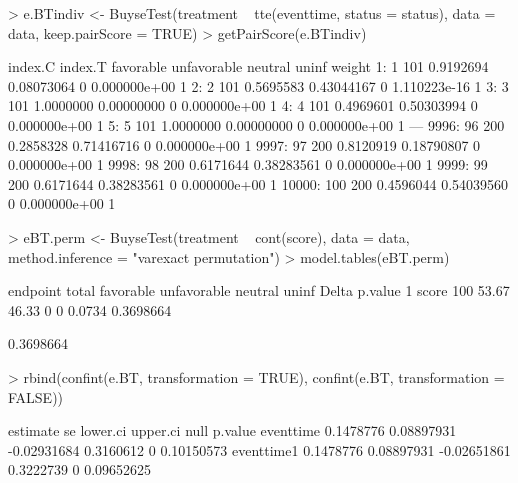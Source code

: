 \documentclass[12pt]{article}
\theoremstyle{definition}
\begin{document}
\begin{Rcode}
> e.BTindiv <- BuyseTest(treatment ~ tte(eventtime, status = status),
                       data = data, keep.pairScore = TRUE)
> getPairScore(e.BTindiv)
\end{Rcode}
\begin{Routput}
       index.C index.T favorable unfavorable neutral        uninf weight
    1:       1     101 0.9192694  0.08073064       0 0.000000e+00      1
    2:       2     101 0.5695583  0.43044167       0 1.110223e-16      1
    3:       3     101 1.0000000  0.00000000       0 0.000000e+00      1
    4:       4     101 0.4969601  0.50303994       0 0.000000e+00      1
    5:       5     101 1.0000000  0.00000000       0 0.000000e+00      1
   ---                                                                  
 9996:      96     200 0.2858328  0.71416716       0 0.000000e+00      1
 9997:      97     200 0.8120919  0.18790807       0 0.000000e+00      1
 9998:      98     200 0.6171644  0.38283561       0 0.000000e+00      1
 9999:      99     200 0.6171644  0.38283561       0 0.000000e+00      1
10000:     100     200 0.4596044  0.54039560       0 0.000000e+00      1
\end{Routput}


\begin{Rcode}
> eBT.perm <- BuyseTest(treatment ~ cont(score), data = data,
                      method.inference = "varexact permutation")
> model.tables(eBT.perm)
\end{Rcode}
\begin{Routput}
  endpoint total favorable unfavorable neutral uninf  Delta   p.value
1    score   100     53.67       46.33       0     0 0.0734 0.3698664
\end{Routput}


\begin{Routput}
0.3698664
\end{Routput}

\clearpage

\begin{Rcode}
> rbind(confint(e.BT, transformation = TRUE),
        confint(e.BT, transformation = FALSE)) 
\end{Rcode}
       
\begin{Routput}
            estimate         se    lower.ci  upper.ci null    p.value
eventtime  0.1478776 0.08897931 -0.02931684 0.3160612    0 0.10150573
eventtime1 0.1478776 0.08897931 -0.02651861 0.3222739    0 0.09652625
\end{Routput}
\end{document}
